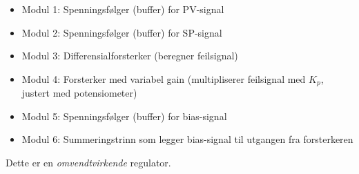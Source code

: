





\begin{itemize}
\item{}Modul 1: Spenningsfølger (buffer) for PV-signal
\vskip 5pt
\item{}Modul 2: Spenningsfølger (buffer) for SP-signal
\vskip 5pt
\item{}Modul 3: Differensialforsterker (beregner feilsignal)
\vskip 5pt
\item{}Modul 4: Forsterker med variabel gain (multipliserer feilsignal med $K_p$, justert med potensiometer)
\vskip 5pt
\item{}Modul 5: Spenningsfølger (buffer) for bias-signal
\vskip 5pt
\item{}Modul 6: Summeringstrinn som legger bias-signal til utgangen fra forsterkeren
\end{itemize} 
 
\vskip 10pt

Dette er en {\it omvendtvirkende} regulator.










